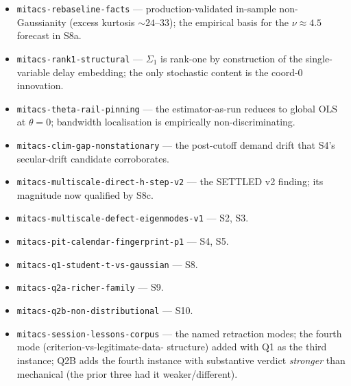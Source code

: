 \documentclass[11pt]{article}
\theoremstyle{definition}
\theoremstyle{plain}
\begin{document}
\begin{itemize}[leftmargin=2em]
\item \texttt{mitacs-rebaseline-facts} --- production-validated
in-sample non-Gaussianity (excess kurtosis $\sim 24$--$33$); the
empirical basis for the $\nu \approx 4.5$ forecast in S8a.
\item \texttt{mitacs-rank1-structural} --- $\Sigma_1$ is rank-one
by construction of the single-variable delay embedding; the only
stochastic content is the coord-$0$ innovation.
\item \texttt{mitacs-theta-rail-pinning} --- the estimator-as-run
reduces to global OLS at $\theta = 0$; bandwidth localisation is
empirically non-discriminating.
\item \texttt{mitacs-clim-gap-nonstationary} --- the post-cutoff
demand drift that S4's secular-drift candidate corroborates.
\item \texttt{mitacs-multiscale-direct-h-step-v2} --- the SETTLED
v2 finding; its magnitude now qualified by S8c.
\item \texttt{mitacs-multiscale-defect-eigenmodes-v1} --- S2, S3.
\item \texttt{mitacs-pit-calendar-fingerprint-p1} --- S4, S5.
\item \texttt{mitacs-q1-student-t-vs-gaussian} --- S8.
\item \texttt{mitacs-q2a-richer-family} --- S9.
\item \texttt{mitacs-q2b-non-distributional} --- S10.
\item \texttt{mitacs-session-lessons-corpus} --- the named
retraction modes; the fourth mode (criterion-vs-legitimate-data-
structure) added with Q1 as the third instance; Q2B adds the
fourth instance with substantive verdict \emph{stronger} than
mechanical (the prior three had it weaker/different).
\end{itemize}
\end{document}
